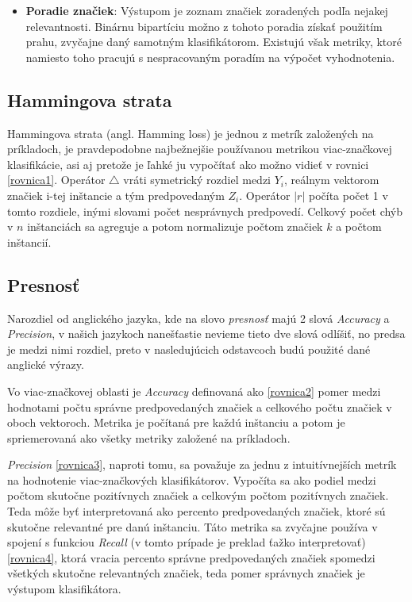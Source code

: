 \begin{itemize}
\begin{itemize}
    \item \textbf{Poradie značiek}: Výstupom je zoznam značiek zoradených podľa nejakej relevantnosti. Binárnu bipartíciu možno z tohoto poradia získať použitím prahu, zvyčajne daný samotným klasifikátorom. Existujú však metriky, ktoré namiesto toho pracujú s nespracovaným poradím na výpočet vyhodnotenia.
    \end{itemize}
\end{itemize}

\subsection*{Hammingova strata} 
Hammingova strata (angl. Hamming loss) je jednou z metrík založených na príkladoch, je pravdepodobne najbežnejšie používanou metrikou viac-značkovej klasifikácie, asi aj pretože je ľahké ju vypočítať ako možno vidieť v rovnici \eqref{rovnica1}. Operátor \(\bigtriangleup\) vráti symetrický rozdiel medzi \(Y_{i}\), reálnym vektorom značiek i-tej inštancie a tým predpovedaným \(Z_{i}\). Operátor \(|r|\) počíta počet 1 v tomto rozdiele, inými slovami počet nesprávnych predpovedí. Celkový počet chýb v \(n\) inštanciách sa agreguje a potom normalizuje počtom značiek \(k\) a počtom inštancií.

\subsection*{Presnosť} 
Narozdiel od anglického jazyka, kde na slovo \textit{presnosť} majú 2 slová \textit{Accuracy} a \textit{Precision}, v našich jazykoch nanešťastie nevieme tieto dve slová odlíšiť, no predsa je medzi nimi rozdiel, preto v nasledujúcich odstavcoch budú použité dané anglické výrazy.  

Vo viac-značkovej oblasti je \textit{Accuracy} definovaná ako \eqref{rovnica2} pomer medzi hodnotami počtu správne predpovedaných značiek a celkového počtu značiek v oboch vektoroch. Metrika je počítaná pre každú inštanciu a potom je spriemerovaná ako všetky metriky založené na príkladoch.

\textit{Precision} \eqref{rovnica3}, naproti tomu, sa považuje za jednu z intuitívnejších metrík na hodnotenie viac-značkových klasifikátorov. Vypočíta sa ako podiel medzi počtom skutočne pozitívnych značiek a celkovým počtom pozitívnych značiek. Teda môže byť interpretovaná ako percento predpovedaných značiek, ktoré sú skutočne relevantné pre danú inštanciu. Táto metrika sa zvyčajne používa v spojení s funkciou \textit{Recall} (v tomto prípade je preklad ťažko interpretovať) \eqref{rovnica4}, ktorá vracia percento správne predpovedaných značiek spomedzi všetkých skutočne relevantných značiek, teda pomer správnych značiek je výstupom klasifikátora.

